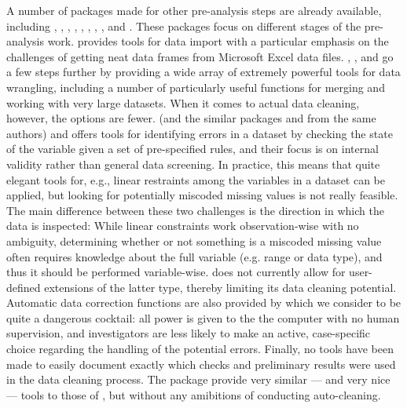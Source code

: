 \documentclass[article,shortnames]{jss}
\begin{document}
A number of  packages made for other pre-analysis steps
are already available, including  \citep{janitor},
 \citep{assertive},  \citep{dplyr},
\citep{tidyr},  \citep{data.table},
 \citep{DataCombine}, 
\citep{validate}, , and \citep{assertr}. These packages
focus on different stages of the pre-analysis work.  
provides tools for data import with a particular emphasis on the
challenges of getting neat data frames from Microsoft Excel data
files. , ,  and
 go a few steps further by providing a wide array of
extremely powerful tools for data wrangling, including a number of
particularly useful functions for merging and working with very large
datasets. When it comes to actual data cleaning, however, the options
are fewer.   (and the similar packages 
\citep{editrules} and  \citep{deducorrect} from the
same authors) and  offers tools for identifying errors
in a dataset by checking the state of the variable given a set of
pre-specified rules, and their focus is on internal validity rather
than general data screening. In practice, this means that quite elegant
tools for, e.g., linear restraints among the variables in a dataset
can be applied, but looking for potentially miscoded missing values is
not really feasible. The main difference between these two challenges
is the direction in which the data is inspected: While linear
constraints work observation-wise with no ambiguity, determining
whether or not something is a miscoded missing value often requires
knowledge about the full variable (e.g. range or data type), and thus
it should be performed variable-wise.  does not
currently allow for user-defined extensions of the latter type,
thereby limiting its data cleaning potential.  Automatic data
correction functions are also provided by  which we
consider to be quite a dangerous cocktail: all power is given to the
the computer with no human supervision, and investigators are less
likely to make an active, case-specific choice regarding the handling
of the potential errors.  Finally, no tools have been made to easily
document exactly which checks and preliminary results were used in the
data cleaning process. The  package provide very similar
--- and very nice --- tools to those of , but without
any amibitions of conducting auto-cleaning.
\end{document}
